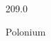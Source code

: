 \documentclass[12pt]{article}
\begin{document}
\hfill{}
\vfill
\begin{center}
  {\fontsize{50}{60}
  }

  209.0

Polonium
\end{center}
\vfill
\end{document}
